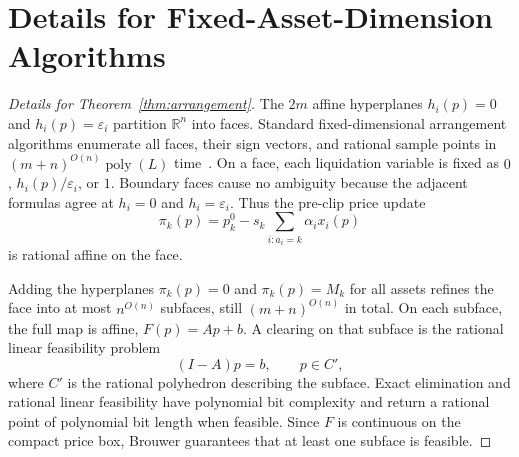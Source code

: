 \documentclass{llncs}
\newcommand{\R}{\mathbb{R}}
\newcommand{\eps}{\varepsilon}
\newcommand{\poly}{\operatorname{poly}}
\begin{document}
\section{Details for Fixed-Asset-Dimension Algorithms}
\label{app:assetdimension}
\begin{proof}[Details for Theorem~\ref{thm:arrangement}]
The \(2m\) affine hyperplanes \(h_i(p)=0\) and \(h_i(p)=\eps_i\) partition \(\R^n\) into faces. Standard fixed-dimensional arrangement algorithms enumerate all faces, their sign vectors, and rational sample points in \((m+n)^{O(n)}\poly(L)\) time~\cite{EdelsbrunnerORourkeSeidel1986}. On a face, each liquidation variable is fixed as \(0\), \(h_i(p)/\eps_i\), or \(1\). Boundary faces cause no ambiguity because the adjacent formulas agree at \(h_i=0\) and \(h_i=\eps_i\). Thus the pre-clip price update
\[
        \pi_k(p)=p_k^0-s_k\sum_{i:a_i=k}\alpha_i x_i(p)
\]
is rational affine on the face.

Adding the hyperplanes \(\pi_k(p)=0\) and \(\pi_k(p)=M_k\) for all assets refines the face into at most \(n^{O(n)}\) subfaces, still \((m+n)^{O(n)}\) in total. On each subface, the full map is affine, \(F(p)=Ap+b\). A clearing on that subface is the rational linear feasibility problem
\[
        (I-A)p=b,\qquad p\in C',
\]
where \(C'\) is the rational polyhedron describing the subface. Exact elimination and rational linear feasibility have polynomial bit complexity and return a rational point of polynomial bit length when feasible. Since \(F\) is continuous on the compact price box, Brouwer guarantees that at least one subface is feasible.
\end{proof}
\end{document}
